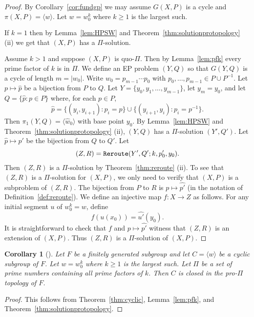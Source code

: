 \documentclass[11pt]{amsart}
\newtheorem{corollary}[theorem]{Corollary}
\theoremstyle{definition}
\theoremstyle{definition}
\numberwithin{equation}{section}
\begin{document}
\begin{proof} By Corollary~\ref{cor:fundgp} we may assume $G(X, P)$ is a cycle and $\pi(X, P)=\langle w\rangle$. Let $w=w_0^k$ where $k\geq 1$ is the largest such. 

If $k=1$ then by Lemma~\ref{lem:HPSW} and Theorem~\ref{thm:solutionprotopology} (ii) we get that $(X,P)$ has a $\Pi$-solution.

Assume $k>1$ and suppose $(X, P)$ is quo-$\Pi$. Then by Lemma~\ref{lem:pfk} every prime factor of $k$ is in $\Pi$. We define an EP problem $(Y, Q)$ so that $G(Y, Q)$ is a cycle of length $m=|w_0|$. Write $w_0=p_{m-1}\cdots p_0$ with $p_0,\dots, p_{m-1}\in P\cup P^{-1}$. Let $p\mapsto \hat{p}$ be a bijection from $P$ to $Q$. Let $Y=\{y_0, y_1, \dots, y_{m-1}\}$, let $y_m=y_0$, and let $Q=\{\hat{p}\colon p\in P\}$ where, for each $p\in P$, 
$$ \hat{p}=\{(y_i, y_{i+1})\colon p_i=p\}\cup \{(y_{i+1}, y_i)\colon p_i=p^{-1}\}. $$
Then $\pi_1(Y, Q)=\langle \hat{w}_0\rangle$ with base point $y_0$. By Lemma~\ref{lem:HPSW} and Theorem~\ref{thm:solutionprotopology} (ii), $(Y, Q)$ has a $\Pi$-solution $(Y', Q')$. Let $\hat{p}\mapsto p'$ be the bijection from $Q$ to $Q'$. Let 
$$ (Z, R)=\mbox{\tt Reroute}(Y', Q'; k, p'_0, y_0). $$
Then $(Z, R)$ is a $\Pi$-solution by Theorem~\ref{thm:reroute} (ii). To see that $(Z, R)$ is a $\Pi$-solution for $(X, P)$, we only need to verify that $(X, P)$ is a subproblem of $(Z, R)$. The bijection from $P$ to $R$ is $p\mapsto \widehat{p'}$ (in the notation of Definition~\ref{def:reroute}). We define an injective map $f\colon X\to Z$ as follows. For any initial segment $u$ of $w_0^k=w$, define
$$ f(u(x_0))=\widehat{u'}(y_0). $$
It is straightforward to check that $f$ and $p\mapsto \widehat{p'}$ witness that $(Z, R)$ is an extension of $(X, P)$. Thus $(Z, R)$ is a $\Pi$-solution of $(X, P)$.
\end{proof}

\begin{corollary}[{\cite[Theorem 1.5]{HPSW19}}] Let $F$ be a finitely generated subgroup and let $C=\langle w\rangle$ be a cyclic subgroup of $F$. Let $w=w_0^k$ where $k\geq 1$ is the largest such. Let $\Pi$ be a set of prime numbers containing all prime factors of $k$. Then $C$ is closed in the pro-$\Pi$ topology of $F$.
\end{corollary}

\begin{proof} This follows from Theorem~\ref{thm:cyclic}, Lemma~\ref{lem:pfk}, and Theorem~\ref{thm:solutionprotopology}.
\end{proof}
\end{document}
